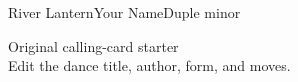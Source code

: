 \documentclass[medium]{contracard}
\begin{document}
\begin{contra}{River Lantern}{Your Name}{Duple minor}
\setlength{\phrasevspace}{0em}
\renewcommand*{\partdelimiter}{:}
\newdancephrase
\balanceand*[Partner]
\newdancephrase
\ladieschain
{}
\vspace*{\fill}
\begin{flushright}
Original calling-card starter\\
Edit the dance title, author, form, and moves.
\end{flushright}
\end{contra}
\end{document}

